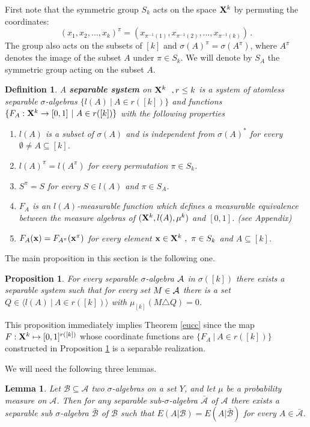 \documentclass [11pt] {article}
\newtheorem{lemma}{Lemma}[section]
\newtheorem{proposition}{Proposition}[section]
\newtheorem{definition}{Definition}[section]
\def\cA{\mbox{$\cal A$}}
\def\cA{\mbox{$\cal A$}}
\def\to{\rightarrow}
\def\xo{{\bf X}}
\def\muo{\mu}
\begin{document}
First note that the symmetric group $S_k$ acts on the space $\xo^k$ by
permuting the coordinates:
$$(x_1,x_2,\dots,x_k)^\pi=(x_{\pi^{-1}(1)}, x_{\pi^{-1}(2)},\dots,
x_{\pi^{-1}(k)})\,.$$
The group also acts on the subsets of $[k]$ and $\sigma(A)^\pi=
\sigma(A^\pi)$, where $A^\pi$ denotes the image of the subset $A$
under $\pi\in S_k$. We will denote by $S_A$ the symmetric group
acting on the subset $A$.

\begin{definition}\label{sepre} A {\bf separable system} on
  $\xo^k~~, r\leq k$ is a system of atomless separable $\sigma$-algebras
  $\{l(A)~|~A\in r([k])\}$ and
functions $\{F_A:\xo^k\to
  [0,1]~|~A\in r([k])\}$ with the
following properties
\begin{enumerate}
\item $l(A)$ is a subset of $\sigma(A)$ and is independent
from $\sigma(A)^*$ for every $\emptyset\neq
  A\subseteq [k]$.
\item $l(A)^\pi=l(A^\pi)$ for every permutation $\pi\in S_k$.
\item $S^\pi=S$ for every $S\in l(A)$ and $\pi\in S_A$.
\item $F_A$ is an $l(A)$-measurable function which defines a measurable
equivalence
between the measure algebras of $(\xo^k,l(A),\muo^k)$ and $[0,1]$. (see
Appendix)
\item $F_A({\bf x})=F_{A^\pi}({\bf x}^\pi)$ for every element
${\bf x}\in\xo^k~,~\pi\in S_k$ and
$A\subseteq [k]$.
\end{enumerate}
\end{definition}


 The main proposition in this section is the following one.

\begin{proposition}\label{reali} For every separable $\sigma$-algebra
$\cA$ in $\sigma([k])$ there exists
 a separable system such that for every set $M\in\cA$
there is a set $Q\in\langle l(A)~|~A\in r([k])\rangle$ with
$\mu_{[k]}(M\triangle Q)=0$.
\end{proposition}

This proposition immediately implies Theorem \ref{eucc} since the map
$F:\xo^k\mapsto [0,1]^{r([k])}$ whose coordinate functions are $\{F_A~|~A\in
r([k])\}$ constructed in Proposition \ref{reali}
is a separable realization.

We will need the following three lemmas.

\begin{lemma}\label{sep1} Let $\mathcal{B}\subseteq\mathcal{A}$ two
$\sigma$-algebras on a
  set $Y$, and let $\mu$ be a probability measure on $\mathcal{A}$. Then for
  any separable sub-$\sigma$-algebra $\bar{\mathcal{A}}$ of $\mathcal{A}$
  there exists
 a separable sub $\sigma$-algebra $\bar{\mathcal{B}}$ of $\mathcal{B}$
  such that $E(A|\mathcal{B})=E(A|\bar{\mathcal{B}})$
for every $A\in\bar{\mathcal{A}}$.
\end{lemma}
\end{document}
